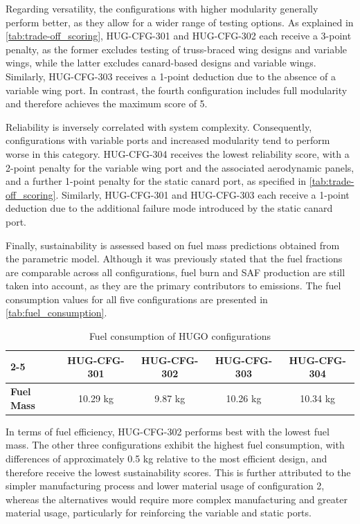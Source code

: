 Regarding versatility, the configurations with higher modularity generally perform better, as they allow for a wider range of testing options. As explained in \autoref{tab:trade-off_scoring}, HUG-CFG-301 and HUG-CFG-302 each receive a 3-point penalty, as the former excludes testing of truss-braced wing designs and variable wings, while the latter excludes canard-based designs and variable wings. Similarly, HUG-CFG-303 receives a 1-point deduction due to the absence of a variable wing port. In contrast, the fourth configuration includes full modularity and therefore achieves the maximum score of 5.

Reliability is inversely correlated with system complexity. Consequently, configurations with variable ports and increased modularity tend to perform worse in this category. HUG-CFG-304 receives the lowest reliability score, with a 2-point penalty for the variable wing port and the associated aerodynamic panels, and a further 1-point penalty for the static canard port, as specified in \autoref{tab:trade-off_scoring}. Similarly, HUG-CFG-301 and HUG-CFG-303 each receive a 1-point deduction due to the additional failure mode introduced by the static canard port.

Finally, sustainability is assessed based on fuel mass predictions obtained from the parametric model. Although it was previously stated that the fuel fractions are comparable across all configurations, fuel burn and SAF production are still taken into account, as they are the primary contributors to emissions. The fuel consumption values for all five configurations are presented in \autoref{tab:fuel_consumption}.

\begin{table}[H]
\centering
\caption{Fuel consumption of HUGO configurations}
\label{tab:fuel_consumption}


\begin{tabular}{|l|c|c|c|c|}
\cline{2-5}
\multicolumn{1}{c|}{} 
& \textbf{HUG-CFG-301} & \textbf{HUG-CFG-302} & \textbf{HUG-CFG-303} & \textbf{HUG-CFG-304}\\
\hline
\textbf{Fuel Mass} & 10.29 kg & 9.87 kg & 10.26 kg & 10.34 kg\\
\hline
\end{tabular}

\end{table}

In terms of fuel efficiency, HUG-CFG-302 performs best with the lowest fuel mass. The other three configurations exhibit the highest fuel consumption, with differences of approximately 0.5 kg relative to the most efficient design, and therefore receive the lowest sustainability scores. This is further attributed to the simpler manufacturing process and lower material usage of configuration 2, whereas the alternatives would require more complex manufacturing and greater material usage, particularly for reinforcing the variable and static ports.

